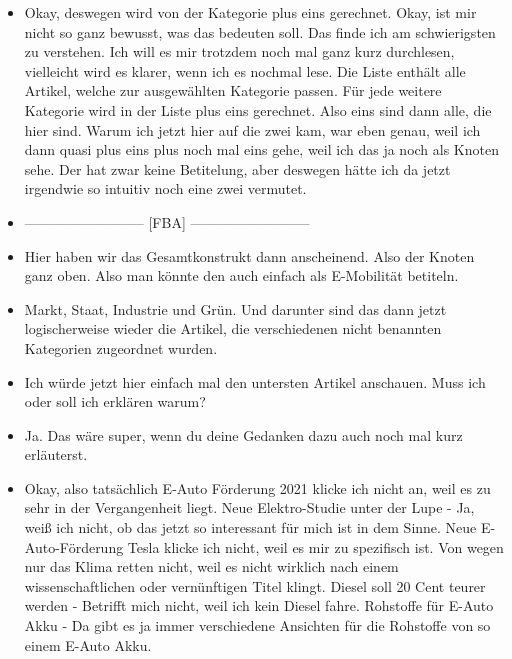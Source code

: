 {\begin{itemize}[]
        \item {} Okay, deswegen wird von der Kategorie plus eins gerechnet.
              Okay, ist mir nicht so ganz bewusst, was das bedeuten soll.
              Das finde ich am schwierigsten zu verstehen.
              Ich will es mir trotzdem noch mal ganz kurz durchlesen, vielleicht wird es klarer, wenn ich es nochmal lese.
              Die Liste enthält alle Artikel, welche zur ausgewählten Kategorie passen.
              Für jede weitere Kategorie wird in der Liste plus eins gerechnet.
              Also eins sind dann alle, die hier sind.
              Warum ich jetzt hier auf die zwei kam, war eben genau, weil ich dann quasi plus eins plus noch mal eins gehe, weil ich das ja noch als Knoten sehe.
              Der hat zwar keine Betitelung, aber deswegen hätte ich da jetzt irgendwie so intuitiv noch eine zwei vermutet.
        \item {--------------------------} [FBA] {--------------------------}
        \item {} Hier haben wir das Gesamtkonstrukt dann anscheinend.
              Also der Knoten ganz oben.
              Also man könnte den auch einfach als E-Mobilität betiteln.
        \item {} Markt, Staat, Industrie und Grün.
              Und darunter sind das dann jetzt logischerweise wieder die Artikel, die verschiedenen nicht benannten Kategorien zugeordnet wurden.
        \item {} Ich würde jetzt hier einfach mal den untersten Artikel anschauen. Muss ich oder soll ich erklären warum?
        \item {} Ja. Das wäre super, wenn du deine Gedanken dazu auch noch mal kurz erläuterst.
        \item {} Okay, also tatsächlich \flqq E-Auto Förderung 2021\frqq{} klicke ich nicht an, weil es zu sehr in der Vergangenheit liegt.
              \flqq Neue Elektro-Studie unter der Lupe\frqq{} - Ja, weiß ich nicht, ob das jetzt so interessant für mich ist in dem Sinne.
              \flqq Neue E-Auto-Förderung Tesla\frqq{} klicke ich nicht, weil es mir zu spezifisch ist.
              \flqq Von wegen nur das Klima retten\frqq{} nicht, weil es nicht wirklich nach einem wissenschaftlichen oder vernünftigen Titel klingt.
              \flqq Diesel soll 20 Cent teurer werden\frqq{} - Betrifft mich nicht, weil ich kein Diesel fahre.
              \flqq Rohstoffe für E-Auto Akku\frqq{} - Da gibt es ja immer verschiedene Ansichten für die Rohstoffe von so einem E-Auto Akku.

\end{itemize}}
